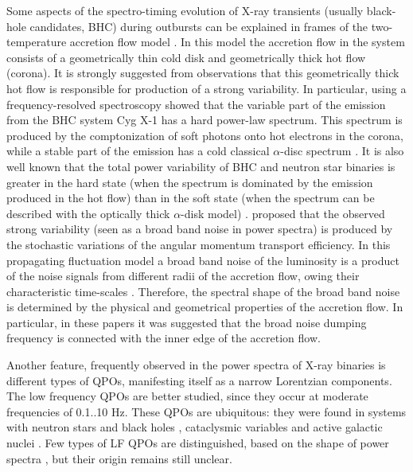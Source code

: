 \documentclass[a4paper,fleqn,usenatbib]{mnras}
\begin{document}
Some aspects of the spectro-timing evolution of X-ray transients (usually black-hole candidates, BHC) during outbursts can be explained in frames of the two-temperature accretion flow model \citep{1975ApJ...199L.153E, 1976ApJ...204..187S, 1995ApJ...452..710N}. In this model the accretion flow in the system consists of a geometrically thin cold disk and geometrically thick hot flow (corona). 
It is strongly suggested from observations that this geometrically thick hot flow is responsible for production of a strong variability. 
In particular, using a frequency-resolved spectroscopy \citet{2001MNRAS.321..759C} showed that the variable part of the emission from the BHC system Cyg X-1 has a hard power-law spectrum. This spectrum is produced by the comptonization of soft photons onto hot electrons in the corona, while a stable part of the emission has a cold classical $\alpha$-disc spectrum \citep{shakura73}.  
It is also well known that the total power variability of BHC and neutron star binaries is greater in the hard state (when the spectrum is dominated by the emission produced in the hot flow) than in the soft state (when the spectrum can be described with the optically thick $\alpha$-disk model) \citep[][e.t.c.]{1992ApJ...391L..21M, 2000A&A...363.1013R, 2001ApJS..132..377H, 2001MNRAS.321..759C}. 
\citet{1997MNRAS.292..679L} proposed that the observed strong variability (seen as a broad band noise in power spectra) is produced by the stochastic variations of the angular momentum transport efficiency. 
In this propagating fluctuation model a broad band noise of the luminosity is a product of the noise signals from different radii of the accretion flow, owing their characteristic time-scales \citep[see, e.g.,][]{2006MNRAS.367..801A, 2013MNRAS.434.1476I}. 
Therefore, the spectral shape of the broad band noise is determined by the physical and geometrical properties of the accretion flow. In particular, in these papers it was suggested that the broad noise dumping frequency is connected with the inner edge of the accretion flow. 

Another feature, frequently observed in the power spectra of X-ray binaries is different types of  QPOs, manifesting itself as a narrow Lorentzian components. The low frequency QPOs are better studied, since they occur at moderate frequencies of 0.1..10 Hz. These QPOs are ubiquitous: they were found in systems with neutron stars and black holes \citep{wijnands99}, cataclysmic variables \citep{mauche02} and active galactic nuclei \citep{gierlinskiy08}. Few types of LF QPOs are distinguished, based on the shape of power spectra \citep[see, e.g.][]{casella05}, but their origin remains still unclear.
\end{document}
